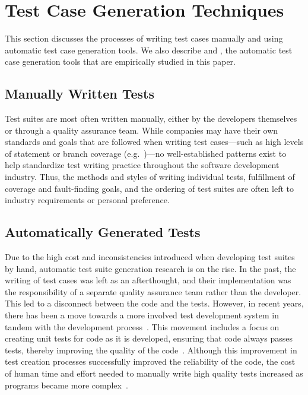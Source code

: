 
\section{Test Case Generation Techniques}
\label{sec:background}

This section discusses the processes of writing test cases manually and using automatic test case generation tools.  We also describe \codepro and \evo, the automatic test case generation tools that are empirically studied in this paper.

\subsection{Manually Written Tests}

Test suites are most often written manually, either by the developers themselves or through a quality assurance team.  While companies may have their own standards and goals that are followed when writing test cases---such as high levels of statement or branch coverage (e.g.~\cite{DO-178B, IEC61508})---no well-established patterns exist to help standardize test writing practice throughout the software development industry. Thus, the methods and styles of writing individual tests, fulfillment of coverage and fault-finding goals, and the ordering of test suites are often left to industry requirements or personal preference.  

\subsection{Automatically Generated Tests}

Due to the high cost and inconsistencies introduced when developing test suites by hand, automatic test suite generation research is on the rise.  In the past, the writing of test cases was left as an afterthought, and their implementation was the responsibility of a separate quality assurance team rather than the developer.  This led to a disconnect between the code and the tests.  However, in recent years, there has been a move towards a more involved test development system in tandem with the development process~\cite{Gelperin:1988:GST:62959.62965}.  This movement includes a focus on creating unit tests for code as it is developed, ensuring that code always passes tests, thereby improving the quality of the code~\cite{Canfora:2006:EAT:1159733.1159788}.  Although this improvement in test creation processes successfully improved the reliability of the code, the cost of human time and effort needed to manually write high quality tests increased as programs became more complex~\cite{clarke1998automated}. 

